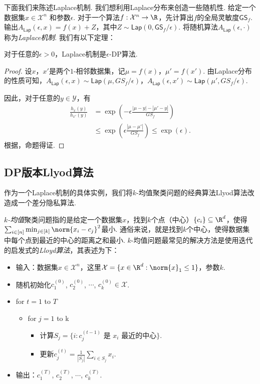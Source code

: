 下面我们来陈述Laplace机制. 我们想利用Laplace分布来创造一些随机性. 给定一个数据集$x \in \mathcal X^n$ 和参数$\epsilon$. 对于一个算法$f:\mathcal X^n \to \R$，先计算出$f$的全局灵敏度$\mathsf{GS}_f$. 输出$A_{\mathsf{Lap}}(\epsilon, x) = f(x) + Z$，其中$Z\sim \mathsf{Lap}(0, \mathsf{GS}_f/\epsilon)$. 将随机算法$A_{\mathsf{Lap}}(\epsilon, \cdot)$称为\emph{Laplace机制}. 我们有以下定理：
\begin{theorem}\label{thm:laplace-mechanism}
    对于任意的$\epsilon > 0$，Laplace机制是$\epsilon$-DP算法.
\end{theorem}
\begin{proof}
设$x$，$x'$是两个$1$-相邻数据集，记$\mu = f(x)$，$\mu' = f(x')$. 由Laplace分布的性质可知，$A_{\mathsf{Lap}}(\epsilon, x) \sim \mathsf{Lap}(\mu, GS_f/\epsilon)$，$A_{\mathsf{Lap}}(\epsilon, x') \sim \mathsf{Lap}(\mu', GS_f/\epsilon)$.

因此，对于任意的$y \in \mathcal Y$，有
    \[
    \begin{aligned}
        \frac{h_{x}(y)}{h_{x'}(y)} &=\exp \left(-\epsilon \frac{|\mu - y| - |\mu' - y|}{GS_f} \right) \\
        &\leq \exp \left(\epsilon \frac{|\mu - \mu'|}{GS_f} \right)\leq \exp(\epsilon).
    \end{aligned}
    \]
根据，命题得证. 
\end{proof}

\subsection{DP版本Llyod算法}
作为一个Laplace机制的具体实例，我们将$k$-均值聚类问题的经典算法Llyod算法改造成一个差分隐私算法.

\emph{$k$-均值}聚类问题指的是给定一个数据集$x$，找到$k$个点（中心）$\{c_i\} \subseteq \R^d$，使得$\sum_{i \in [n]} \min_{j\in[k]} \norm{x_i - c_j}^2$最小. 通俗来说，就是找到$k$个中心，使得数据集中每个点到最近的中心的距离之和最小. $k$-均值问题最常见的解决方法是使用迭代的启发式的\emph{Lloyd算法}，其表述为下：
\begin{itemize}
    \item 输入：数据集$x \in \mathcal X^n$，这里$\mathcal X = \{x \in \R^d : \norm{x}_1 \leq 1 \}$，参数$k$.
    \item 随机初始化$c_1^{(0)}$, $c_2^{(0)}$, $\cdots$, $c_k^{(0)} \in \mathcal X$.
    \item for $t=1$ to $T$
    \begin{itemize}
        \item for $j=1$ to k
        \begin{itemize}
            \item 计算$S_j = \{i : c_{j}^{(t-1)} \text{ 是\ } x_i \text{ 最近的中心}\}$.
            \item 更新$c_j^{(t)} = \frac1{|S_j|}\sum_{i\in S_j} x_i$.
        \end{itemize}
    \end{itemize}
    \item 输出：$c_1^{(T)}$, $c_2^{(T)}$, $\cdots$, $c_k^{(T)}$.
\end{itemize}

